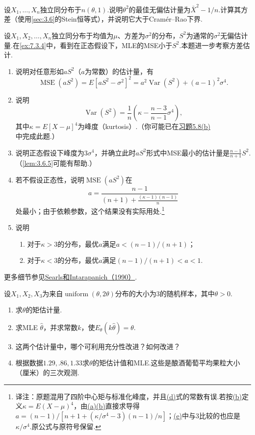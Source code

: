 \begin{exercise}\label{exercise:7.44}
设$X_1,\ldots,X_n$独立同分布于$n(\theta,1)$.说明$\theta^2$的最佳无偏估计量为$\bar X^2-1/n$.计算其方差（使用\autoref{sec:3.6}的Stein恒等式），并说明它大于Cramér--Rao下界.
\end{exercise}
\begin{exercise}\label{exercise:7.45}
设$X_1,X_2,\ldots,X_n$独立同分布于均值为$\mu$、方差为$\sigma^2$的分布，$S^2$为通常的$\sigma^2$无偏估计量.在\autoref{ex:7.3.4}中，看到在正态假设下，MLE的MSE小于$S^2$.本题进一步考察方差估计.
\begin{enumerate}[label=(\alph*)]
\item{}\label{itm:exercise:7.45:a} 说明对任意形如$aS^2$（$a$为常数）的估计量，有
$$\operatorname{MSE}(aS^2)=E[aS^2-\sigma^2]^2=a^2\operatorname{Var}(S^2)+(a-1)^2\sigma^4.$$
\item{}\label{itm:exercise:7.45:b} 说明
$$\operatorname{Var}(S^2)=\frac1n\left(\kappa-\frac{n-3}{n-1}\sigma^4\right),$$
其中$\kappa=E[X-\mu]^4$为峰度（kurtosis）.（你可能已在\hyperref[item:5.8.b]{习题5.8(b)}中完成此题.）
\item 说明正态假设下峰度为$3\sigma^4$，并确立此时$aS^2$形式中MSE最小的估计量是$\frac{n-1}{n+1}S^2$.（\autoref{lem:3.6.5}可能有帮助.）
\item{}\label{itm:exercise:7.45:d} 若不假设正态性，说明$\operatorname{MSE}(aS^2)$在
$$a=\frac{n-1}{(n+1)+\frac{(\kappa-1)(n-1)}n}$$
处最小；由于依赖参数，这个结果没有实际用处.\footnote{译注：原题混用了四阶中心矩与标准化峰度，并且\hyperref[itm:exercise:7.45:d]{(d)}式的常数有误.若按\hyperref[itm:exercise:7.45:b]{(b)}定义$\kappa=E(X-\mu)^4$，由\hyperref[itm:exercise:7.45:a]{(a)}\hyperref[itm:exercise:7.45:b]{(b)}直接求导得$a=(n-1)/[n+1+(\kappa/\sigma^4-3)(n-1)/n]$；\hyperref[itm:exercise:7.45:e]{(e)}中与3比较的也应是$\kappa/\sigma^4$.原公式与原符号保留.}
\item{}\label{itm:exercise:7.45:e} 说明
\begin{enumerate}[label=(\roman*)]
\item 对于$\kappa>3$的分布，最优$a$满足$a<(n-1)/(n+1)$；
\item 对于$\kappa<3$的分布，最优$a$满足$(n-1)/(n+1)<a<1$.
\end{enumerate}
\end{enumerate}
更多细节参见\hyperref[bib:source284]{Searls和Intarapanich（1990）}.
\end{exercise}
\begin{exercise}\label{exercise:7.46}
设$X_1,X_2,X_3$为来自$\operatorname{uniform}(\theta,2\theta)$分布的大小为3的随机样本，其中$\theta>0$.
\begin{enumerate}[label=(\alph*)]
\item 求$\theta$的矩估计量.
\item 求MLE $\widehat\theta$，并求常数$k$，使$E_\theta(k\widehat\theta)=\theta$.
\item 这两个估计量中，哪个可利用充分性改进？如何改进？
\item 根据数据$1.29,.86,1.33$求$\theta$的矩估计值和MLE.这些是酿酒葡萄平均果粒大小（厘米）的三次观测.
\end{enumerate}
\end{exercise}
